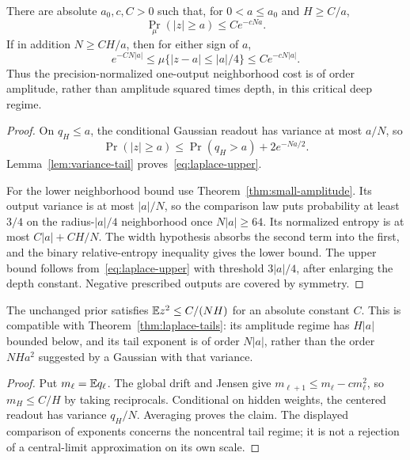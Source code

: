 \begin{theorem}
\label{thm:laplace-tails}
There are absolute $a_0,c,C>0$ such that, for $0<a\le a_0$ and $H\ge C/a$,
\begin{equation}
 \Pr_\mu(|z|\ge a)\le C e^{-cNa}.
 \label{eq:laplace-upper}
\end{equation}
If in addition $N\ge C H/a$, then for either sign of $a$,
\begin{equation}
 e^{-CN|a|}\le
 \mu\{|z-a|\le|a|/4\}\le C e^{-cN|a|}.
 \label{eq:laplace-neighborhood}
\end{equation}
Thus the precision-normalized one-output neighborhood cost is of order amplitude, rather than amplitude squared times depth, in this critical deep regime.
\end{theorem}
\begin{proof}
On $q_H\le a$, the conditional Gaussian readout has variance at most $a/N$, so
\[
 \Pr(|z|\ge a)\le\Pr(q_H>a)+2e^{-Na/2}.
\]
Lemma~\ref{lem:variance-tail} proves~\eqref{eq:laplace-upper}.

For the lower neighborhood bound use Theorem~\ref{thm:small-amplitude}. Its output variance is at most $|a|/N$, so the comparison law puts probability at least $3/4$ on the radius-$|a|/4$ neighborhood once $N|a|\ge64$. Its normalized entropy is at most $C|a|+CH/N$. The width hypothesis absorbs the second term into the first, and the binary relative-entropy inequality gives the lower bound. The upper bound follows from~\eqref{eq:laplace-upper} with threshold $3|a|/4$, after enlarging the depth constant. Negative prescribed outputs are covered by symmetry.
\end{proof}

\begin{corollary}
The unchanged prior satisfies $\mathbb E z^2\le C/(NH)$ for an absolute constant $C$. This is compatible with Theorem~\ref{thm:laplace-tails}: its amplitude regime has $H|a|$ bounded below, and its tail exponent is of order $N|a|$, rather than the order $NHa^2$ suggested by a Gaussian with that variance.
\end{corollary}
\begin{proof}
Put $m_\ell=\mathbb E q_\ell$. The global drift and Jensen give
$m_{\ell+1}\le m_\ell-cm_\ell^2$, so $m_H\le C/H$ by taking reciprocals. Conditional on hidden weights, the centered readout has variance $q_H/N$. Averaging proves the claim. The displayed comparison of exponents concerns the noncentral tail regime; it is not a rejection of a central-limit approximation on its own scale.
\end{proof}
